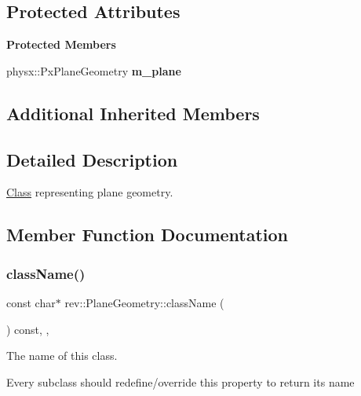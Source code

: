 \subsection*{Protected Attributes}
\begin{Indent}\textbf{ Protected Members}\par
\begin{DoxyCompactItemize}
\item 
\mbox{\label{classrev_1_1_plane_geometry_a02cf953c66eeba9f0c7e511e20721062}} 
physx\+::\+Px\+Plane\+Geometry {\bfseries m\+\_\+plane}
\end{DoxyCompactItemize}
\end{Indent}
\subsection*{Additional Inherited Members}


\subsection{Detailed Description}
\mbox{\hyperlink{struct_class}{Class}} representing plane geometry. 

\subsection{Member Function Documentation}
\mbox{\label{classrev_1_1_plane_geometry_a20bc1985065668b3e9716c8252d6b070}} 
\subsubsection{\texorpdfstring{className()}{className()}}
{\footnotesize\ttfamily const char$\ast$ rev\+::\+Plane\+Geometry\+::class\+Name (\begin{DoxyParamCaption}{ }\end{DoxyParamCaption}) const\hspace{0.3cm}{\ttfamily [inline]}, {\ttfamily [override]}, {\ttfamily [virtual]}}



The name of this class. 

Every subclass should redefine/override this property to return its name 

